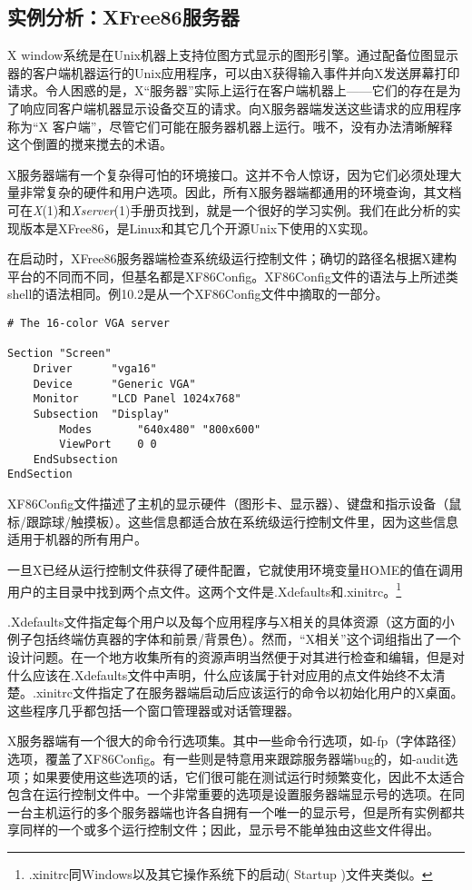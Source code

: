 \documentclass[12pt,oneside]{book}
\begin{document}
\begin{common-format}
\subsection{实例分析：XFree86服务器}
X window系统是在Unix机器上支持位图方式显示的图形引擎。通过配备位图显示器的客户端机器运行的Unix应用程序，可以由X获得输入事件并向X发送屏幕打印请求。令人困惑的是，X“服务器”实际上运行在客户端机器上——它们的存在是为了响应同客户端机器显示设备交互的请求。向X服务器端发送这些请求的应用程序称为“X
客户端”，尽管它们可能在服务器机器上运行。哦不，没有办法清晰解释这个倒置的搅来搅去的术语。

X服务器端有一个复杂得可怕的环境接口。这并不令人惊讶，因为它们必须处理大量非常复杂的硬件和用户选项。因此，所有X服务器端都通用的环境查询，其文档可在\textit{X}(1)和\textit{Xserver}(1)手册页找到，就是一个很好的学习实例。我们在此分析的实现版本是XFree86，是Linux和其它几个开源Unix下使用的X实现。

在启动时，XFree86服务器端检查系统级运行控制文件；确切的路径名根据X建构平台的不同而不同，但基名都是XF86Config。XF86Config文件的语法与上所述类shell的语法相同。例10.2是从一个XF86Config文件中摘取的一部分。

\begin{Verbatim}[label=例10.2  X配置示例]
# The 16-color VGA server

Section "Screen"
    Driver      "vga16"
    Device      "Generic VGA"
    Monitor     "LCD Panel 1024x768"
    Subsection  "Display"
        Modes       "640x480" "800x600"
        ViewPort    0 0
    EndSubsection
EndSection
\end{Verbatim}


XF86Config文件描述了主机的显示硬件（图形卡、显示器）、键盘和指示设备（鼠标/跟踪球/触摸板）。这些信息都适合放在系统级运行控制文件里，因为这些信息适用于机器的所有用户。

一旦X已经从运行控制文件获得了硬件配置，它就使用环境变量HOME的值在调用用户的主目录中找到两个点文件。这两个文件是.Xdefaults和.xinitrc。\footnote{.xinitrc同Windows以及其它操作系统下的启动( Startup )文件夹类似。}

.Xdefaults文件指定每个用户以及每个应用程序与X相关的具体资源（这方面的小例子包括终端仿真器的字体和前景/背景色）。然而，“X相关”这个词组指出了一个设计问题。在一个地方收集所有的资源声明当然便于对其进行检查和编辑，但是对什么应该在.Xdefaults文件中声明，什么应该属于针对应用的点文件始终不太清楚。.xinitrc文件指定了在服务器端启动后应该运行的命令以初始化用户的X桌面。这些程序几乎都包括一个窗口管理器或对话管理器。

X服务器端有一个很大的命令行选项集。其中一些命令行选项，如-fp（字体路径）选项，覆盖了XF86Config。有一些则是特意用来跟踪服务器端bug的，如-audit选项；如果要使用这些选项的话，它们很可能在测试运行时频繁变化，因此不太适合包含在运行控制文件中。一个非常重要的选项是设置服务器端显示号的选项。在同一台主机运行的多个服务器端也许各自拥有一个唯一的显示号，但是所有实例都共享同样的一个或多个运行控制文件；因此，显示号不能单独由这些文件得出。


\end{common-format}
\end{document}
